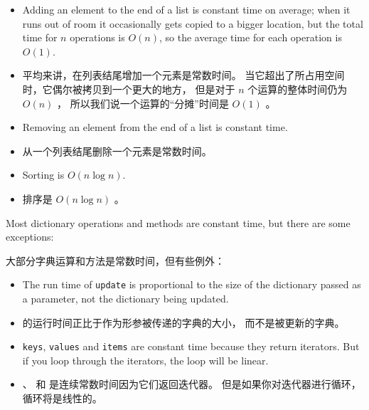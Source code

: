 \begin{itemize}

\item Adding an element to the end of a list is constant time on
average; when it runs out of room it occasionally gets copied
to a bigger location, but the total time for $n$ operations
is $O(n)$, so the average time for each
operation is $O(1)$.

\item 平均来讲，在列表结尾增加一个元素是常数时间。 当它超出了所占用空间时，它偶尔被拷贝到一个更大的地方， 但是对于 $n$ 个运算的整体时间仍为 $O(n)$ ， 所以我们说一个运算的“分摊”时间是 $O(1)$ 。

\item Removing an element from the end of a list is constant time.

\item 从一个列表结尾删除一个元素是常数时间。

\item Sorting is $O(n \log n)$.

\item 排序是 $O(n \log n)$ 。
  

\end{itemize}

Most dictionary operations and methods are constant time, but
there are some exceptions:

大部分字典运算和方法是常数时间，但有些例外：

\begin{itemize}

\item The run time of {\tt update} is
  proportional to the size of the dictionary passed as a parameter,
  not the dictionary being updated.

\item {} 的运行时间正比于作为形参被传递的字典的大小，
   而不是被更新的字典。

\item {\tt keys}, {\tt values} and {\tt items} are constant time because
  they return iterators.  But if you loop through the iterators, the loop will be linear.

\item {}、  和  是连续常数时间因为它们返回迭代器。
   但是如果你对迭代器进行循环，循环将是线性的。

\end{itemize}

